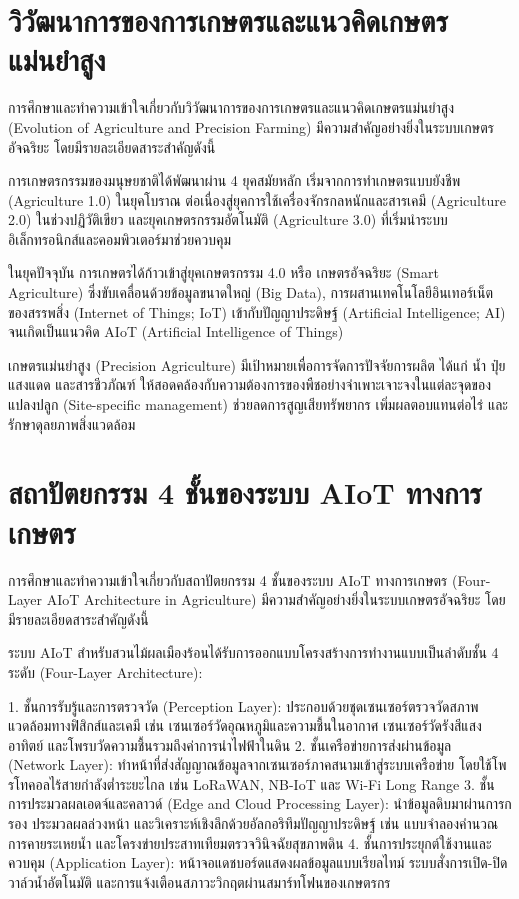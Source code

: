 
\section{วิวัฒนาการของการเกษตรและแนวคิดเกษตรแม่นยำสูง}

การศึกษาและทำความเข้าใจเกี่ยวกับวิวัฒนาการของการเกษตรและแนวคิดเกษตรแม่นยำสูง (Evolution of Agriculture and Precision Farming) มีความสำคัญอย่างยิ่งในระบบเกษตรอัจฉริยะ โดยมีรายละเอียดสาระสำคัญดังนี้

การเกษตรกรรมของมนุษยชาติได้พัฒนาผ่าน 4 ยุคสมัยหลัก เริ่มจากการทำเกษตรแบบยังชีพ (Agriculture 1.0) ในยุคโบราณ ต่อเนื่องสู่ยุคการใช้เครื่องจักรกลหนักและสารเคมี (Agriculture 2.0) ในช่วงปฏิวัติเขียว และยุคเกษตรกรรมอัตโนมัติ (Agriculture 3.0) ที่เริ่มนำระบบอิเล็กทรอนิกส์และคอมพิวเตอร์มาช่วยควบคุม

ในยุคปัจจุบัน การเกษตรได้ก้าวเข้าสู่ยุคเกษตรกรรม 4.0 หรือ เกษตรอัจฉริยะ (Smart Agriculture) ซึ่งขับเคลื่อนด้วยข้อมูลขนาดใหญ่ (Big Data), การผสานเทคโนโลยีอินเทอร์เน็ตของสรรพสิ่ง (Internet of Things; IoT) เข้ากับปัญญาประดิษฐ์ (Artificial Intelligence; AI) จนเกิดเป็นแนวคิด AIoT (Artificial Intelligence of Things)

เกษตรแม่นยำสูง (Precision Agriculture) มีเป้าหมายเพื่อการจัดการปัจจัยการผลิต ได้แก่ น้ำ ปุ๋ย แสงแดด และสารชีวภัณฑ์ ให้สอดคล้องกับความต้องการของพืชอย่างจำเพาะเจาะจงในแต่ละจุดของแปลงปลูก (Site-specific management) ช่วยลดการสูญเสียทรัพยากร เพิ่มผลตอบแทนต่อไร่ และรักษาดุลยภาพสิ่งแวดล้อม

\section{สถาปัตยกรรม 4 ชั้นของระบบ AIoT ทางการเกษตร}

การศึกษาและทำความเข้าใจเกี่ยวกับสถาปัตยกรรม 4 ชั้นของระบบ AIoT ทางการเกษตร (Four-Layer AIoT Architecture in Agriculture) มีความสำคัญอย่างยิ่งในระบบเกษตรอัจฉริยะ โดยมีรายละเอียดสาระสำคัญดังนี้

ระบบ AIoT สำหรับสวนไม้ผลเมืองร้อนได้รับการออกแบบโครงสร้างการทำงานแบบเป็นลำดับชั้น 4 ระดับ (Four-Layer Architecture):

1. ชั้นการรับรู้และการตรวจวัด (Perception Layer): ประกอบด้วยชุดเซนเซอร์ตรวจวัดสภาพแวดล้อมทางฟิสิกส์และเคมี เช่น เซนเซอร์วัดอุณหภูมิและความชื้นในอากาศ เซนเซอร์วัดรังสีแสงอาทิตย์ และโพรบวัดความชื้นรวมถึงค่าการนำไฟฟ้าในดิน
2. ชั้นเครือข่ายการส่งผ่านข้อมูล (Network Layer): ทำหน้าที่ส่งสัญญาณข้อมูลจากเซนเซอร์ภาคสนามเข้าสู่ระบบเครือข่าย โดยใช้โพรโทคอลไร้สายกำลังต่ำระยะไกล เช่น LoRaWAN, NB-IoT และ Wi-Fi Long Range
3. ชั้นการประมวลผลเอดจ์และคลาวด์ (Edge and Cloud Processing Layer): นำข้อมูลดิบมาผ่านการกรอง ประมวลผลล่วงหน้า และวิเคราะห์เชิงลึกด้วยอัลกอริทึมปัญญาประดิษฐ์ เช่น แบบจำลองคำนวณการคายระเหยน้ำ และโครงข่ายประสาทเทียมตรวจวินิจฉัยสุขภาพดิน
4. ชั้นการประยุกต์ใช้งานและควบคุม (Application Layer): หน้าจอแดชบอร์ดแสดงผลข้อมูลแบบเรียลไทม์ ระบบสั่งการเปิด-ปิดวาล์วน้ำอัตโนมัติ และการแจ้งเตือนสภาวะวิกฤตผ่านสมาร์ทโฟนของเกษตรกร


